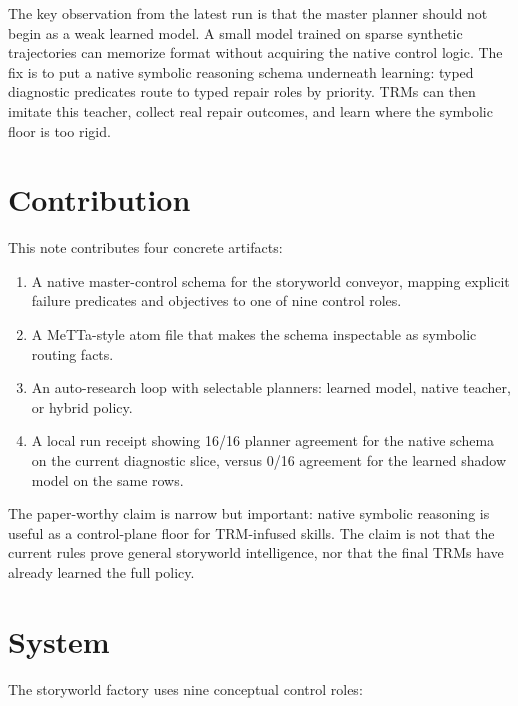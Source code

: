 \documentclass[11pt]{article}
\begin{document}
The key observation from the latest run is that the master planner should not begin as a weak learned model. A small model trained on sparse synthetic trajectories can memorize format without acquiring the native control logic. The fix is to put a native symbolic reasoning schema underneath learning: typed diagnostic predicates route to typed repair roles by priority. TRMs can then imitate this teacher, collect real repair outcomes, and learn where the symbolic floor is too rigid.

\section{Contribution}

This note contributes four concrete artifacts:

\begin{enumerate}
  \item A native master-control schema for the storyworld conveyor, mapping explicit failure predicates and objectives to one of nine control roles.
  \item A MeTTa-style atom file that makes the schema inspectable as symbolic routing facts.
  \item An auto-research loop with selectable planners: learned model, native teacher, or hybrid policy.
  \item A local run receipt showing 16/16 planner agreement for the native schema on the current diagnostic slice, versus 0/16 agreement for the learned shadow model on the same rows.
\end{enumerate}

The paper-worthy claim is narrow but important: native symbolic reasoning is useful as a control-plane floor for TRM-infused skills. The claim is not that the current rules prove general storyworld intelligence, nor that the final TRMs have already learned the full policy.

\section{System}

The storyworld factory uses nine conceptual control roles:
\end{document}
